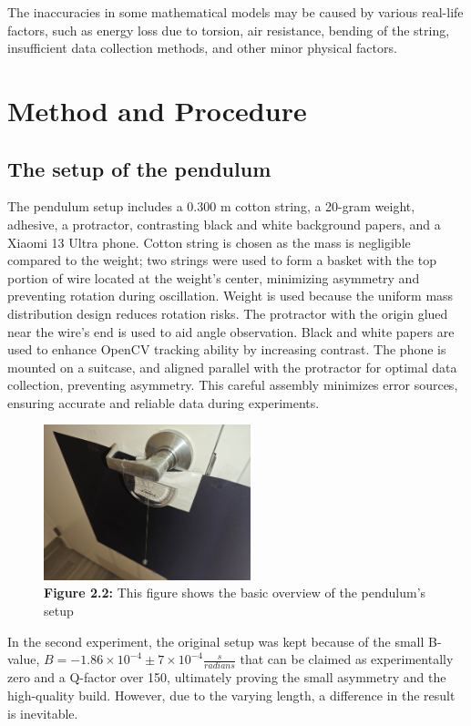 \documentclass[11pt,titlepage,a4paper,twocolumn]{article}
\begin{document}
    The inaccuracies in some mathematical models may be caused by various real-life factors, such as energy loss due to torsion, air resistance, bending of the string, insufficient data collection methods, and other minor physical factors.


\section{Method and Procedure}
    \subsection{The setup of the pendulum}
        {\hspace{\parindent}\hspace{\parindent}The pendulum setup includes a 0.300 m cotton string, a 20-gram weight, adhesive, a protractor, contrasting black and white background papers, and a Xiaomi 13 Ultra phone. Cotton string is chosen as the mass is negligible compared to the weight; two strings were used to form a basket with the top portion of wire located at the weight’s center, minimizing asymmetry and preventing rotation during oscillation. Weight is used because the uniform mass distribution design reduces rotation risks. The protractor with the origin glued near the wire’s end is used to aid angle observation. Black and white papers are used to enhance OpenCV tracking ability by increasing contrast. The phone is mounted on a suitcase, and aligned parallel with the protractor for optimal data collection, preventing asymmetry. This careful assembly minimizes error sources, ensuring accurate and reliable data during experiments.
        }
        \begin{figure}[H]
        \centering
        \includegraphics[width=6cm]{setup 1.jpg}
        \captionsetup{labelformat=empty}
        \caption{\textbf{Figure 2.2:} This figure shows the basic overview of the pendulum's setup}
        \end{figure}

    In the second experiment, the original setup was kept because of the small B-value, $B = -1.86\times10^{-4}  \pm 7\times10^{-4} \frac{s}{radians}$ that can be claimed as experimentally zero and a Q-factor over 150, ultimately proving the small asymmetry and the high-quality build. However, due to the varying length, a difference in the result is inevitable.
    
\end{document}
